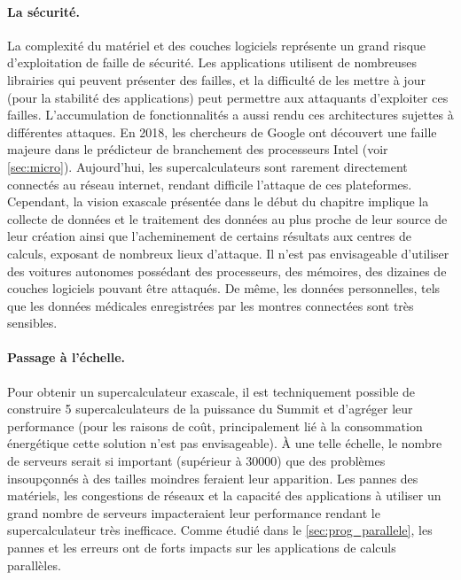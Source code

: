         \paragraph{La sécurité.} La complexité du matériel et des couches logiciels représente un grand risque d'exploitation de faille de sécurité. Les applications utilisent de nombreuses librairies qui peuvent présenter des failles, et la difficulté de les mettre à jour (pour la stabilité des applications) peut permettre aux attaquants d'exploiter ces failles. L'accumulation de fonctionnalités a aussi rendu ces architectures sujettes à différentes attaques. En 2018, les chercheurs de Google \cite{kocher2018spectre} ont découvert une faille majeure dans le prédicteur de branchement des processeurs Intel (voir \autoref{sec:micro}). Aujourd'hui, les supercalculateurs sont rarement directement connectés au réseau internet, rendant difficile l'attaque de ces plateformes. Cependant, la vision exascale présentée dans le début du chapitre implique la collecte de données et le traitement des données au plus proche de leur source de leur création ainsi que l'acheminement de certains résultats aux centres de calculs, exposant de nombreux lieux d'attaque. Il n’est pas envisageable d'utiliser des voitures autonomes possédant des processeurs, des mémoires, des dizaines de couches logiciels pouvant être attaqués. De même, les données personnelles, tels que les données médicales enregistrées par les montres connectées sont très sensibles.
    
        
        \paragraph{Passage à l'échelle.} Pour obtenir un supercalculateur exascale, il est techniquement possible de construire 5 supercalculateurs de la puissance du Summit et d’agréger leur performance (pour les raisons de coût, principalement lié à la consommation énergétique cette solution n’est pas envisageable). À une telle échelle, le nombre de serveurs serait si important (supérieur à 30000) que des problèmes insoupçonnés à des tailles moindres feraient leur apparition. Les pannes des matériels, les congestions de réseaux et la capacité des applications à utiliser un grand nombre de serveurs impacteraient leur performance rendant le supercalculateur très inefficace. Comme étudié dans le \autoref{sec:prog_parallele}, les pannes et les erreurs ont de forts impacts sur les applications de calculs parallèles. 
        

